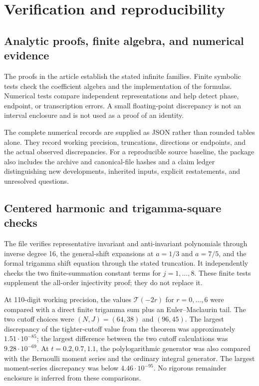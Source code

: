\documentclass[11pt,a4paper]{article}
\numberwithin{equation}{section}
\theoremstyle{definition}
\theoremstyle{remark}
\newcommand{\src}[1]{\texttt{\detokenize{#1}}}
\begin{document}


\section{Verification and reproducibility}
\label{verify:section}

\subsection{Analytic proofs, finite algebra, and numerical evidence}

The proofs in the article establish the stated infinite families.
Finite symbolic tests check the coefficient algebra and the
implementation of the formulas. Numerical tests compare independent
representations and help detect phase, endpoint, or transcription
errors. A small floating-point discrepancy is not an interval
enclosure and is not used as a proof of an identity.

The complete numerical records are supplied as JSON rather than
rounded tables alone. They record working precision, truncations,
directions or endpoints, and the actual observed discrepancies.
For a reproducible source baseline, the package also includes the
archive and canonical-file hashes and a claim ledger distinguishing
new developments, inherited inputs, explicit restatements, and
unresolved questions.

\subsection{Centered harmonic and trigamma-square checks}

The file \src{code/verify_harmonic_parity.py} verifies representative
invariant and anti-invariant polynomials through inverse degree 16,
the general-shift expansions at $a=1/3$ and $a=7/5$, and the formal
trigamma shift equation through the stated truncation. It independently
checks the two finite-summation constant terms for $j=1,\ldots,8$.
These finite tests supplement the all-order injectivity proof;
they do not replace it.

At 110-digit working precision, the values $\mathcal T(-2r)$ for
$r=0,\ldots,6$ were compared with a direct finite trigamma sum plus
an Euler--Maclaurin tail. The two cutoff choices were
$(N,J)=(64,38)$ and $(96,45)$. The largest discrepancy of the
tighter-cutoff value from the theorem was approximately
$1.51\cdot10^{-85}$; the largest difference between the two
cutoff calculations was $9.28\cdot10^{-69}$.
At $t=0.2,0.7,1.1$, the polylogarithmic generator was also compared
with the Bernoulli moment series and the ordinary integral generator.
The largest moment-series discrepancy was below $4.46\cdot10^{-95}$.
No rigorous remainder enclosure is inferred from these comparisons.
\end{document}
